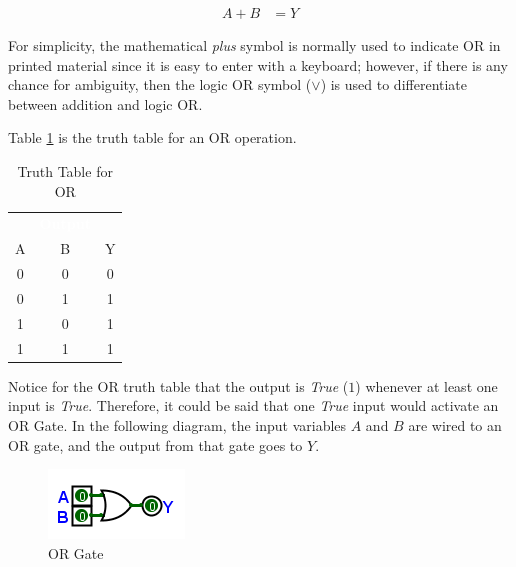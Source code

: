 \begin{align}
  \label{BF:eq:or_plus}
  A + B &= Y 
\end{align}

For simplicity, the mathematical \emph{plus} symbol is normally used to indicate \textsf{OR}  in printed material since it is easy to enter with a keyboard; however, if there is any chance for ambiguity, then the logic \textsf{OR}  symbol ($ \vee $) is used to differentiate between addition and logic \textsf{OR}.

Table \ref{BF:tab:truth_table_for_or} is the truth table for an \textsf{OR}  operation.

\begin{table}[H]
  \sffamily
  \newcommand{\head}[1]{\textcolor{white}{\textbf{#1}}}    
  \begin{center}
    \begin{tabular}{ccc} 
      \rowcolor{black!75}
      \multicolumn{2}{c}{\head{Inputs}} & \head{Output} \\
      A & B & Y \\
      \hline
      0 & 0 & 0 \\
      0 & 1 & 1 \\
      1 & 0 & 1 \\
      1 & 1 & 1 
    \end{tabular}
  \end{center}
  \caption{Truth Table for OR}
  \label{BF:tab:truth_table_for_or}
\end{table}

Notice for the \textsf{OR} truth table that the output is \emph{True} ($ 1 $) whenever at least one input is \emph{True}. Therefore, it could be said that one \emph{True} input would activate an \textsf{OR} Gate. In the following diagram, the input variables $ A $ and $ B $ are wired to an \textsf{OR}  gate, and the output from that gate goes to $ Y $. 

\begin{figure}[H]
	\centering
	\includegraphics[width=\maxwidth{.95\linewidth}]{gfx/04_03}
	\caption{OR Gate}
	\label{fig:04_03}
\end{figure}

